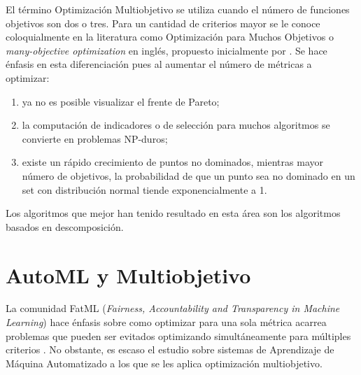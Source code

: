  El t\'ermino Optimizaci\'on Multiobjetivo se utiliza cuando el n\'umero de funciones objetivos son dos o tres. Para un cantidad de criterios mayor se le conoce coloquialmente en la literatura como Optimizaci\'on para Muchos Objetivos o \textit{many-objective optimization} en ingl\'es, propuesto inicialmente por . Se hace \'enfasis en esta diferenciaci\'on pues al aumentar el n\'umero de m\'etricas a optimizar:
 \begin{enumerate}
     \item ya no es posible visualizar el frente de Pareto;
     \item la computaci\'on de indicadores o de selecci\'on para muchos algoritmos se convierte en problemas NP-duros;
     \item existe un r\'apido crecimiento de puntos no dominados, mientras mayor n\'umero de objetivos, la probabilidad de que un punto sea no dominado en un set con distribuci\'on normal tiende exponencialmente a 1.
 \end{enumerate}

Los algoritmos que mejor han tenido resultado en esta \'area son los algoritmos basados en descomposici\'on.


\section{AutoML y Multiobjetivo}\label{background:mooautoml}

La comunidad FatML (\textit{Fairness, Accountability and Transparency in Machine Learning}) hace \'enfasis sobre como optimizar para una sola m\'etrica acarrea problemas que pueden ser evitados optimizando simult\'aneamente para m\'ultiples criterios . No obstante, es escaso el estudio sobre sistemas de Aprendizaje de M\'aquina Automatizado a los que se les aplica optimizaci\'on multiobjetivo.

